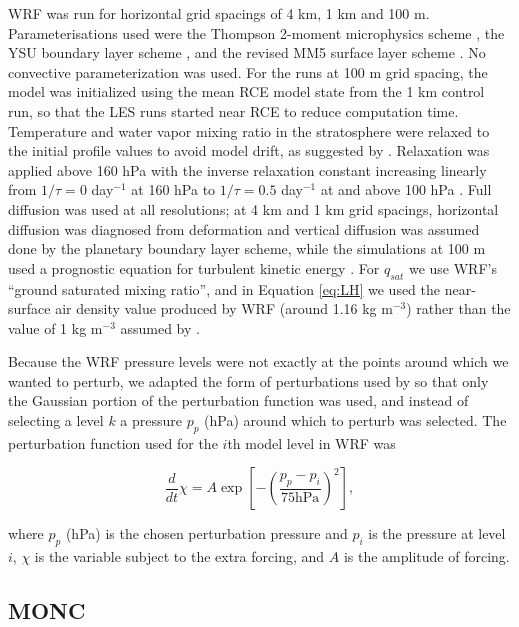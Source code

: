 \documentclass[draft]{agujournal2019}
\begin{document}
WRF was run for horizontal grid spacings of 4 km, 1 km and 100 m.
Parameterisations used were the Thompson 2-moment microphysics scheme
\cite{Thompson_MWR_2008}, the YSU boundary layer scheme \cite{Hong_MWR_2006},
and the revised MM5 surface layer scheme \cite{Jimenez_MWR_2012}. No convective
parameterization was used. For the runs at 100 m grid spacing, the model was
initialized using the mean RCE model state from the 1 km control run, so that
the LES runs started near RCE to reduce computation time. Temperature and water
vapor mixing ratio in the stratosphere were relaxed to the initial profile
values to avoid model drift, as suggested by .
Relaxation was applied above 160 hPa with the inverse relaxation constant
increasing linearly from $1/\tau = 0$ day$^{-1}$ at 160 hPa to $1/\tau = 0.5$
day$^{-1}$ at and above 100 hPa \cite{Herman_JAMES_2013}. Full diffusion was
used at all resolutions; at 4 km and 1 km grid spacings, horizontal diffusion
was diagnosed from deformation and vertical diffusion was assumed done by the
planetary boundary layer scheme, while the simulations at 100 m used a
prognostic equation for turbulent kinetic energy \cite{Skamarock_2019}. For
$q_{sat}$ we use WRF's ``ground saturated mixing ratio'', and in Equation
\ref{eq:LH} we used the near-surface air density value produced by WRF (around
1.16 kg m$^{-3}$) rather than the value of 1 kg m$^{-3}$ assumed by
. 

Because the WRF pressure levels were not exactly at the points around which we
wanted to perturb, we adapted the form of perturbations used by
 so that only the Gaussian portion of the perturbation
function was used, and instead of selecting a level $k$ a pressure $p_p$ (hPa)
around which to perturb was selected. The perturbation function used for the
$i$th model level in WRF was

\begin{equation}
\frac{d}{dt} \chi = A \exp\left[ - \left( \frac{p_p - p_i}{75 \textrm{hPa}}\right)^2 \right],
\end{equation}

\noindent where $p_p$ (hPa) is the chosen perturbation pressure and $p_i$ is the
pressure at level $i$, $\chi$ is the variable subject to the extra forcing, and
$A$ is the amplitude of forcing.

\subsection{MONC}
\end{document}
